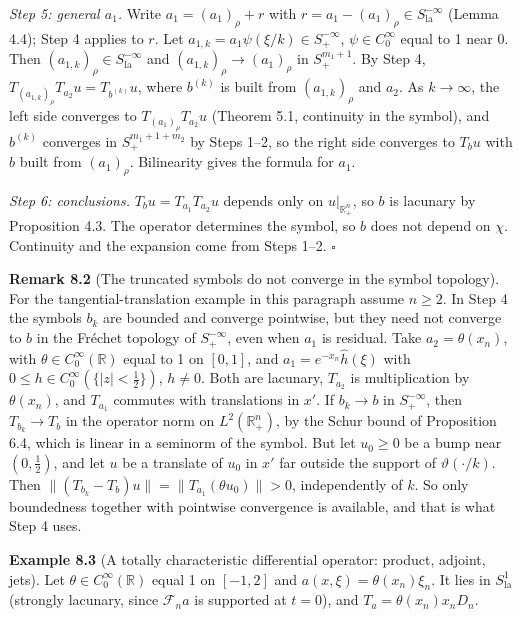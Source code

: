 \documentclass[
  11pt,
]{article}
\begin{document}
\emph{Step 5: general \(a_1\).} Write \(a_1=(a_1)_\rho+r\) with
\(r=a_1-(a_1)_\rho\in S^{-\infty}_{\mathrm{la}}\) (Lemma 4.4); Step 4
applies to \(r\). Let \(a_{1,k}=a_1\psi(\xi/k)\in S^{-\infty}_+\),
\(\psi\in C_0^\infty\) equal to 1 near 0. Then
\((a_{1,k})_\rho\in S^{-\infty}_{\mathrm{la}}\) and
\((a_{1,k})_\rho\to(a_1)_\rho\) in \(S^{m_1+1}_+\). By Step 4,
\(T_{(a_{1,k})_\rho}T_{a_2}u=T_{b^{(k)}}u\), where \(b^{(k)}\) is built
from \((a_{1,k})_\rho\) and \(a_2\). As \(k\to\infty\), the left side
converges to \(T_{(a_1)_\rho}T_{a_2}u\) (Theorem 5.1, continuity in the
symbol), and \(b^{(k)}\) converges in \(S^{m_1+1+m_2}_+\) by Steps 1--2,
so the right side converges to \(T_bu\) with \(b\) built from
\((a_1)_\rho\). Bilinearity gives the formula for \(a_1\).

\emph{Step 6: conclusions.} \(T_bu=T_{a_1}T_{a_2}u\) depends only on
\(u|_{\mathbb R^n_+}\), so \(b\) is lacunary by Proposition 4.3. The
operator determines the symbol, so \(b\) does not depend on \(\chi\).
Continuity and the expansion come from Steps 1--2. \(\square\)

\textbf{Remark 8.2} (The truncated symbols do not converge in the symbol
topology). For the tangential-translation example in this paragraph
assume \(n\ge2\). In Step 4 the symbols \(b_k\) are bounded and converge
pointwise, but they need not converge to \(b\) in the Fréchet topology
of \(S^{-\infty}_+\), even when \(a_1\) is residual. Take
\(a_2=\theta(x_n)\), with \(\theta\in C_0^\infty(\mathbb R)\) equal to 1
on \([0,1]\), and \(a_1=e^{-x_n}\widehat h(\xi)\) with
\(0\leq h\in C_0^\infty(\{|z|<\tfrac12\})\), \(h\neq0\). Both are
lacunary, \(T_{a_2}\) is multiplication by \(\theta(x_n)\), and
\(T_{a_1}\) commutes with translations in \(x'\). If \(b_k\to b\) in
\(S^{-\infty}_+\), then \(T_{b_k}\to T_b\) in the operator norm on
\(L^2(\mathbb R^n_+)\), by the Schur bound of Proposition 6.4, which is
linear in a seminorm of the symbol. But let \(u_0\geq0\) be a bump near
\((0,\tfrac12)\), and let \(u\) be a translate of \(u_0\) in \(x'\) far
outside the support of \(\vartheta(\cdot/k)\). Then
\(\|(T_{b_k}-T_b)u\|=\|T_{a_1}(\theta u_0)\|>0\), independently of
\(k\). So only boundedness together with pointwise convergence is
available, and that is what Step 4 uses.

\textbf{Example 8.3} (A totally characteristic differential operator:
product, adjoint, jets). Let \(\theta\in C_0^\infty(\mathbb R)\) equal 1
on \([-1,2]\) and \(a(x,\xi)=\theta(x_n)\xi_n\). It lies in
\(S^1_{\mathrm{la}}\) (strongly lacunary, since \(\mathcal F_na\) is
supported at \(t=0\)), and \(T_a=\theta(x_n)x_nD_n\).
\end{document}
